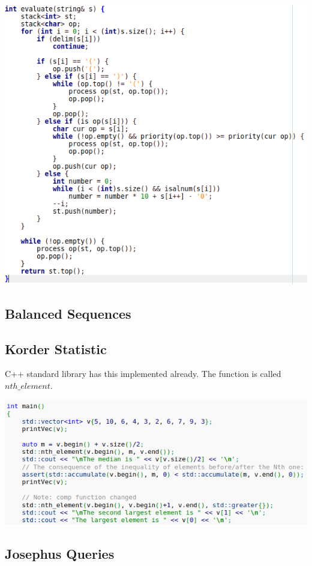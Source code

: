 \documentclass[11pt,twocolumn]{article}
\begin{document}
\includegraphics[scale=0.4]{parseb}

\subsection{Balanced Sequences}

\subsection{Korder Statistic}
C++ standard library has this implemented already. The function is called $nth\_element$.

\includegraphics[scale=0.4]{nthelement}

\subsection{Josephus Queries}
\end{document}
